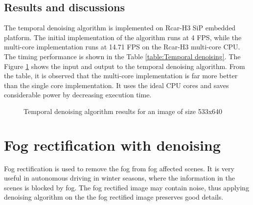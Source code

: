 \subsection{Results and discussions}
The temporal denoising algorithm is implemented on Rcar-H3 SiP embedded platform. The initial implementation of the algorithm runs at 4 FPS, while the multi-core implementation runs at 14.71 FPS on the Rcar-H3 multi-core CPU. The timing performance is shown in the Table \ref{table:Temporal denoising}. The Figure \ref{fig:fog rectification results} shows the input and output to the temporal denoising algorithm. From the table, it is observed that the multi-core implementation is far more better than the single core implementation. It uses the ideal CPU cores and saves considerable power by decreasing execution time.
\begin{figure}[h!]
	\centering
	\qquad
	\caption{Temporal denoising algorithm results for an image of size 533x640  }%
	\label{fig:fog rectification results}%
\end{figure}

\begin{table}[h!]
	\centering
	\caption{Temporal denoising performance statistics}
	\label{table:Temporal denoising}
\end{table}
\section{Fog rectification with denoising \cite{anisotropic} \cite{dehaze} \cite{fastvis}}
Fog rectification is used to remove the fog from fog affected scenes. It is very useful in autonomous driving in winter seasons, where the information in the scenes is blocked by fog. The fog rectified image may contain noise, thus applying denoising algorithm on the the fog rectified image preserves good details.
